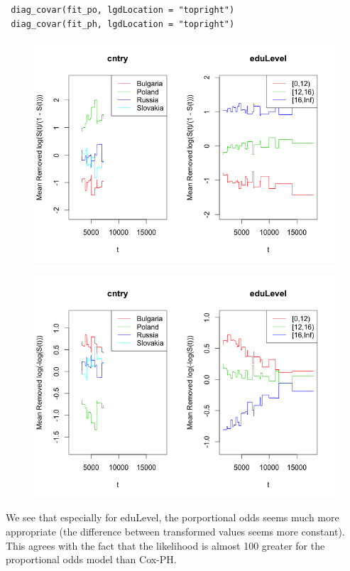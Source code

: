 \documentclass[11pt]{report}
\begin{document}
 \begin{verbatim}
 diag_covar(fit_po, lgdLocation = "topright")
 diag_covar(fit_ph, lgdLocation = "topright")
 \end{verbatim}

  \begin{figure}
  \includegraphics{diagCovarPO.png}
  \end{figure}
  
  \begin{figure}
  \includegraphics{diagCovarPH.png}
  \end{figure}

  We see that especially for eduLevel, the porportional odds
  seems much more appropriate (the difference between 
  transformed values seems more constant). This agrees
  with the fact that the likelihood is almost 100 greater
  for the proportional odds model than Cox-PH. 
  
\end{document}
